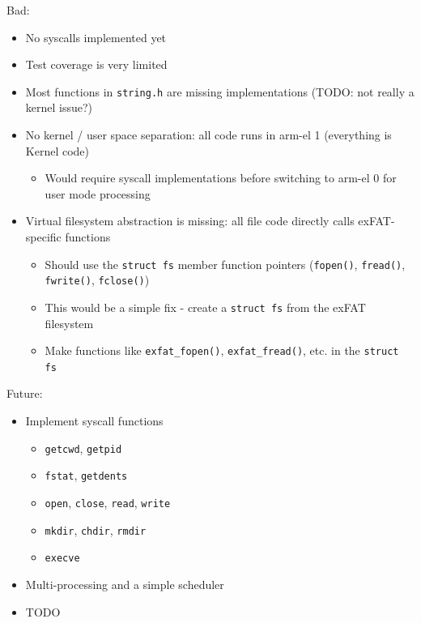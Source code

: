 \documentclass{article}
\begin{document}
Bad:
\begin{itemize}
    \item No syscalls implemented yet
    \item Test coverage is very limited
    \item Most functions in \texttt{string.h} are missing implementations
        (TODO: not really a kernel issue?)
    \item No kernel / user space separation: all code runs in \gls{arm-el} 1
        (everything is Kernel code)
        \begin{itemize}
            \item Would require syscall implementations before switching to
                \gls{arm-el} 0 for user mode processing
        \end{itemize}
    \item Virtual filesystem abstraction is missing: all file code directly
        calls exFAT-specific functions
        \begin{itemize}
            \item Should use the \verb!struct fs! member function pointers
                (\verb!fopen()!, \verb!fread()!, \verb!fwrite()!,
                \verb!fclose()!)
            \item This would be a simple fix - create a \verb!struct fs! from
                the exFAT filesystem
            \item Make functions like \verb!exfat_fopen()!,
                \verb!exfat_fread()!, etc. in the \verb!struct fs!
        \end{itemize}
\end{itemize}

Future:
\begin{itemize}
    \item Implement syscall functions
        \begin{itemize}
            \item \texttt{getcwd}, \texttt{getpid}
            \item \texttt{fstat}, \texttt{getdents}
            \item \texttt{open}, \texttt{close}, \texttt{read}, \texttt{write}
            \item \texttt{mkdir}, \texttt{chdir}, \texttt{rmdir}
            \item \texttt{execve}
        \end{itemize}
    \item Multi-processing and a simple scheduler
    \item TODO
\end{itemize}
\end{document}
